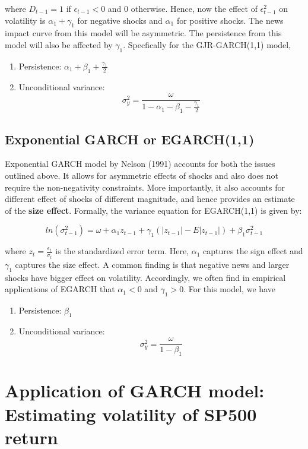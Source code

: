 \documentclass[]{book}
\theoremstyle{definition}
\theoremstyle{definition}
\theoremstyle{definition}
\theoremstyle{remark}
\begin{document}
where \(D_{t-1}=1\) if \(\epsilon_{t-1}<0\) and \(0\) otherwise. Hence,
now the effect of \(\epsilon^2_{t-1}\) on volatility is
\(\alpha_1+\gamma_1\) for negative shocks and \(\alpha_1\) for positive
shocks. The news impact curve from this model will be asymmetric. The
persistence from this model will also be affected by \(\gamma_1\).
Specfically for the GJR-GARCH(1,1) model,

\begin{enumerate}
\def\labelenumi{\arabic{enumi}.}
\item
  Persistence: \(\alpha_1+\beta_1 +\frac{\gamma_1}{2}\)
\item
  Unconditional variance:
  \[\sigma^2_y = \frac{\omega}{1-\alpha_1-\beta_1-\frac{\gamma_1}{2}}\]
\end{enumerate}

\hypertarget{exponential-garch-or-egarch11}{%
\subsection{Exponential GARCH or
EGARCH(1,1)}\label{exponential-garch-or-egarch11}}

Exponential GARCH model by Nelson (1991) accounts for both the issues
outlined above. It allows for asymmetric effects of shocks and also does
not require the non-negativity constraints. More importantly, it also
accounts for different effect of shocks of different magnitude, and
hence provides an estimate of the \textbf{size effect}. Formally, the
variance equation for EGARCH(1,1) is given by:

\[ln(\sigma^2_{t-1})=\omega+ \alpha_1 z_{t-1} +\gamma_1 (|z_{t-1}|-E|z_{t-1}|) +\beta_1\sigma^2_{t-1}\]

where \(z_t=\frac{\epsilon_t}{\sigma_t}\) is the standardized error
term. Here, \(\alpha_1\) captures the sign effect and \(\gamma_1\)
captures the size effect. A common finding is that negative news and
larger shocks have bigger effect on volatility. Accordingly, we often
find in empirical applications of EGARCH that \(\alpha_1<0\) and
\(\gamma_1>0\). For this model, we have

\begin{enumerate}
\def\labelenumi{\arabic{enumi}.}
\item
  Persistence: \(\beta_1\)
\item
  Unconditional variance: \[\sigma^2_y = \frac{\omega}{1-\beta_1}\]
\end{enumerate}

\hypertarget{application-of-garch-model-estimating-volatility-of-sp500-return}{%
\section{Application of GARCH model: Estimating volatility of SP500
return}\label{application-of-garch-model-estimating-volatility-of-sp500-return}}
\end{document}

